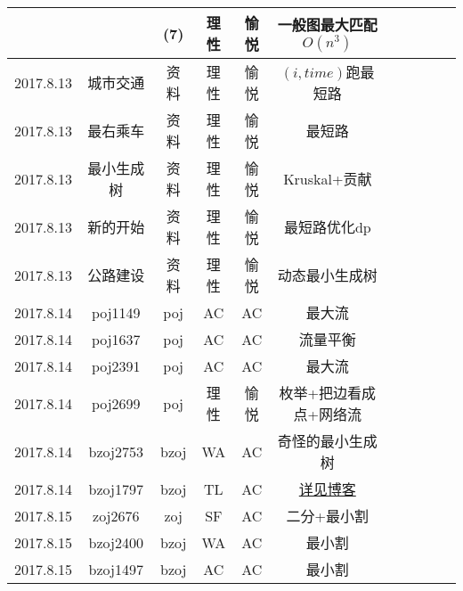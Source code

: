 \documentclass[landscape]{article}
\begin{document}
\begin{longtable}{ccccccccccc}
  & & (7) & 理性 & 愉悦 & 一般图最大匹配$O(n^3)$\\
  \hline
  2017.8.13 & 城市交通 & 资料 & 理性 & 愉悦 & $(i,time)$跑最短路\\
  \hline
  2017.8.13 & 最右乘车 & 资料 & 理性 & 愉悦 & 最短路\\
  \hline
  2017.8.13 & 最小生成树 & 资料 & 理性 & 愉悦 & Kruskal+贡献\\
  \hline
  2017.8.13 & 新的开始 & 资料 & 理性 & 愉悦 & 最短路优化dp\\
  \hline
  2017.8.13 & 公路建设 & 资料 & 理性 & 愉悦 & 动态最小生成树\\
  \hline
  2017.8.14 & poj1149 & poj & AC & AC & 最大流\\
  \hline
  2017.8.14 & poj1637 & poj & AC & AC & 流量平衡\\
  \hline
  2017.8.14 & poj2391 & poj & AC & AC & 最大流\\
  \hline
  2017.8.14 & poj2699 & poj & 理性 & 愉悦 & 枚举+把边看成点+网络流\\
  \hline
  2017.8.14 & bzoj2753 & bzoj & WA & AC & 奇怪的最小生成树\\
  \hline
  2017.8.14 & bzoj1797 & bzoj & TL & AC & \href{http://blog.csdn.net/xy20130630/article/details/77162229}{详见博客}\\
  \hline
  2017.8.15 & zoj2676 & zoj & SF & AC & 二分+最小割\\
  \hline
  2017.8.15 & bzoj2400 & bzoj & WA & AC & 最小割\\
  \hline
  2017.8.15 & bzoj1497 & bzoj & AC & AC & 最小割\\
  \hline
\end{longtable}
\end{document}
